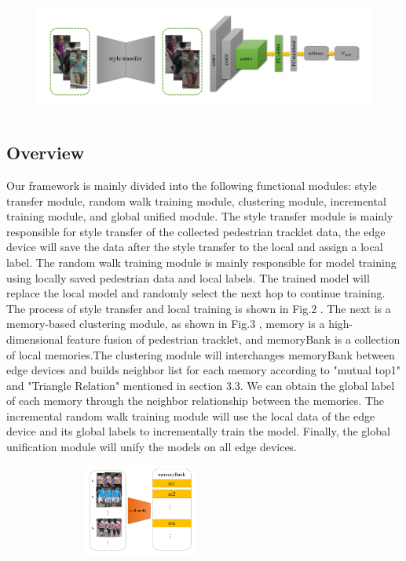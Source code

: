 \documentclass{article}
\begin{document}
\begin{figure}[htb]
    \includegraphics[width=17cm,height=4cm]{fig_2.pdf}
    \caption{}
    \label{}
\end{figure}



\subsection{Overview}
Our framework is mainly divided into the following functional modules: style transfer module, random walk training module, clustering module, incremental training module, and global unified module. The style transfer module is mainly responsible for style transfer of the collected pedestrian tracklet data, the edge device will save the data after the style transfer to the local and assign a local label. The random walk training module is mainly responsible for model training using locally saved pedestrian data and local labels. The trained model will replace the local model and randomly select the next hop to continue training. The process of style transfer and local training is shown in Fig.2 . The next is a memory-based clustering module, as shown in Fig.3 , memory is a high-dimensional feature fusion of pedestrian tracklet, and memoryBank is a collection of local memories.The clustering module will interchanges memoryBank between edge devices and builds neighbor list for each memory according to "mutual top1" and "Triangle Relation" mentioned in section 3.3. We can obtain the global label of each memory through the neighbor relationship between the memories. The incremental random walk training module will use the local data of the edge device and its global labels to incrementally train the model. Finally, the global unification module will unify the models on all edge devices.


\begin{figure}[htb]
    \centerline{\includegraphics[width=7cm,height=3cm]{fig_memory.pdf}}
    \caption{}
    \label{}
\end{figure}
\end{document}
